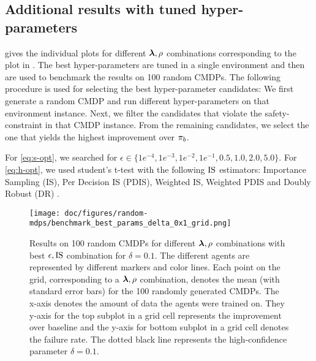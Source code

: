 \subsection{Additional results with tuned hyper-parameters}
\label{app:cmdp-best-param-results}

 gives the individual plots for different $\bm{\lambda}, \rho$ combinations corresponding to the plot in .
The best hyper-parameters are tuned in a single environment and then are used to benchmark the results on 100 random CMDPs. The following procedure is used for selecting the best hyper-parameter candidates: We first generate a random CMDP and run different hyper-parameters on that environment instance. Next, we filter the candidates that violate the safety-constraint in that CMDP instance. From the remaining candidates, we select the one that yields the highest improvement over $\pi_{b}$. 

For \ref{eq:s-opt}, we searched for $\epsilon \in \{1e^{-4}, 1e^{-3}, 1e^{-2}, 1e^{-1}, 0.5, 1.0, 2.0, 5.0\}$. For \ref{eq:h-opt}, we used student's t-test with the following $\text{IS}$ estimators: Importance Sampling (IS), Per Decision IS (PDIS), Weighted IS, Weighted PDIS and Doubly Robust (DR) \citep{precup2000eligibility, jiang2015doubly}.




\begin{figure*}
  \texttt{[image: doc/figures/random-mdps/benchmark\_best\_params\_delta\_0x1\_grid.png]}
  \caption{
  Results on 100 random CMDPs for different $\bm{\lambda}, \rho$ combinations with best $\epsilon, \text{IS}$ combination for $\delta=0.1$.
  The different agents are represented by different markers and color lines. 
  Each point on the grid, corresponding to a $\bm{\lambda}, \rho$ combination, denotes the mean (with standard error bars) for the 100 randomly generated CMDPs. 
  The x-axis denotes the amount of data the agents were trained on. They y-axis for the top subplot in a grid cell represents the improvement over baseline and the y-axis for bottom subplot in a grid cell denotes the failure rate.
  The dotted black line represents the high-confidence parameter $\delta=0.1$.
  }
  \label{fig:best-params-grid}
\end{figure*}




